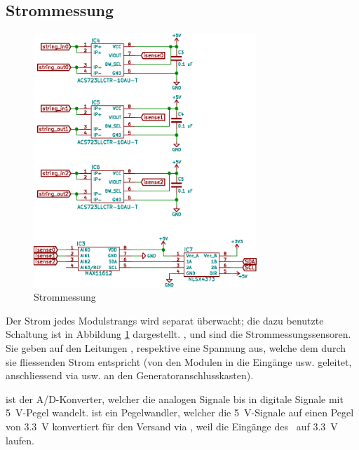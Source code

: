 \subsection{Strommessung}
\label{subsec:hw:master:current}


\begin{figure}[h!t]
    \centering
    \includegraphics[width=0.75\textwidth]{images/superv-sch/supervisor--sch--current.eps}
    \caption{Strommessung}
    \label{fig:sch:master:current}
\end{figure}

Der  Strom jedes  Modulstrangs  wird separat  \"uberwacht;  die dazu  benutzte
Schaltung   ist   in   Abbildung   \ref{fig:sch:master:current}   dargestellt.
,    und   sind  die  Strommessungssensoren. Sie
geben   auf   den    Leitungen   ,      respektive
   eine  Spannung   aus,  welche   dem  durch   sie  fliessenden
Strom  entspricht  (von  den  Modulen  in  die  Eing\"ange  
usw.   geleitet,   anschliessend   via      usw.   an   den
Generatoranschlusskasten).

 ist der A/D-Konverter,  welcher die analogen Signale 
bis    in  digitale  Signale  mit  \SI{5}{\volt}-Pegel  wandelt.
 ist  ein Pegelwandler, welcher die  \SI{5}{\volt}-Signale auf einen
Pegel von  \SI{3.3}{\volt} konvertiert  f\"ur den Versand  via \ISC,  weil die
Eing\"ange des \Raspi~auf \SI{3.3}{\volt} laufen.

